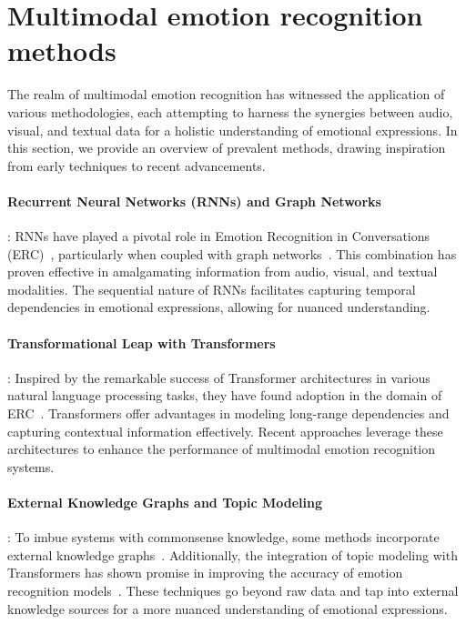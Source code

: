 \section{Multimodal emotion recognition methods}
\label{sec:multimodalEmoRecog}
The realm of multimodal emotion recognition has witnessed the application of various methodologies, each attempting to harness the synergies between audio, visual, and textual data for a holistic understanding of emotional expressions. In this section, we provide an overview of prevalent methods, drawing inspiration from early techniques to recent advancements.

\paragraph{Recurrent Neural Networks (RNNs) and Graph Networks}:
RNNs have played a pivotal role in Emotion Recognition in Conversations (ERC)~\cite{wollmer2010textContext, dialogRNN, jiao2020HMN, sivaprasad2018icmr}, particularly when coupled with graph networks~\cite{ghosal2019dialoguegcn, zhang2019erc}. This combination has proven effective in amalgamating information from audio, visual, and textual modalities. The sequential nature of RNNs facilitates capturing temporal dependencies in emotional expressions, allowing for nuanced understanding.

\paragraph{Transformational Leap with Transformers}:
Inspired by the remarkable success of Transformer architectures in various natural language processing tasks, they have found adoption in the domain of ERC~\cite{m2fnet, shen2021dialogXL}. Transformers offer advantages in modeling long-range dependencies and capturing contextual information effectively. Recent approaches leverage these architectures to enhance the performance of multimodal emotion recognition systems.

\paragraph{External Knowledge Graphs and Topic Modeling}:
To imbue systems with commonsense knowledge, some methods incorporate external knowledge graphs~\cite{cosmic}. Additionally, the integration of topic modeling with Transformers has shown promise in improving the accuracy of emotion recognition models~\cite{todkat}. These techniques go beyond raw data and tap into external knowledge sources for a more nuanced understanding of emotional expressions.

